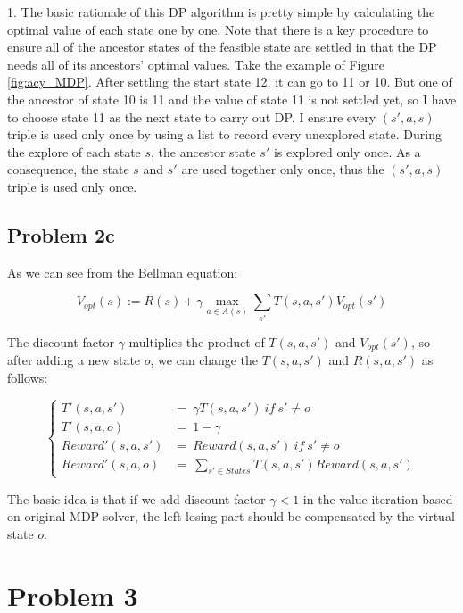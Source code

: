 \documentclass[paper=a4, fontsize=10pt]{scrartcl} %
\numberwithin{equation}{section} %
\numberwithin{figure}{section} %
\numberwithin{table}{section} %
\begin{document}
\begin{spacing}{1.}
The basic rationale of this DP algorithm is pretty simple by calculating the optimal value of each state one by one. Note that there is a key procedure to ensure all of the ancestor states of the feasible state are settled in that the DP needs all of its ancestors' optimal values. Take the example of Figure \ref{fig:acy_MDP}. After settling the start state 12, it can go to 11 or 10. But one of the ancestor of state 10 is 11 and the value of state 11 is not settled yet, so I have to choose state 11 as the next state to carry out DP. I ensure every $(s', a, s)$ triple is used only once by using a list to record every unexplored state. During the explore of each state $s$, the ancestor state $s'$ is explored only once. As a consequence, the state $s$ and $s'$ are used together only once, thus the $(s', a, s)$ triple is used only once.

\subsection{Problem 2c}
As we can see from the Bellman equation:

\begin{equation}
V_{opt}(s) := R(s) + \gamma \max \limits_{a \in A(s)} \sum_{s'} T(s, a, s')V_{opt}(s')
\end{equation}

The discount factor $\gamma$ multiplies the product of $T(s, a, s')$ and $V_{opt}(s')$, so after adding a new state $o$, we can change the $T(s, a, s')$ and $R(s, a, s')$ as follows:

\begin{displaymath}
\left\{
\begin{array}{rl}
T'(s, a, s')&= \ \gamma T(s, a, s') \ if \ s' \ne o\\
T'(s, a, o)&= \ 1 - \gamma\\
Reward'(s, a, s')&= \ Reward(s, a, s') \ if \ s' \ne o\\
Reward'(s, a, o)&= \ \sum_{s' \in States} T(s, a, s')Reward(s, a, s')
\end{array}
\right.
\end{displaymath}

The basic idea is that if we add discount factor $\gamma < 1$ in the value iteration based on original MDP solver, the left losing part should be compensated by the virtual state $o$.

\section{Problem 3}

\end{spacing}
\end{document}
